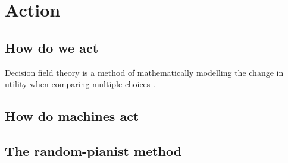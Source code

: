 \chapter{Action}
\section{How do we act}
Decision field theory is a method of mathematically modelling the change in utility when comparing multiple choices \cite{busemeyer2002survey}.

\section{How do machines act}

\section{The random-pianist method}
